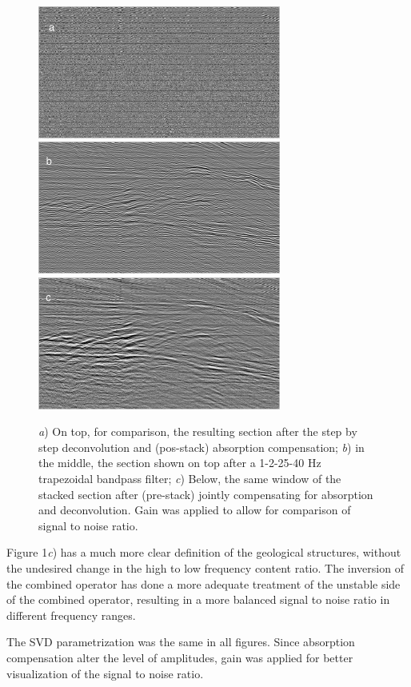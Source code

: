 \documentclass[twoside,letterpaper,twocolumn]{article}
\begin{document}
\begin{figure}[h!]
  \includegraphics[width=8cm]{images/Filtro_pos_empilhamento.jpg}
  \includegraphics[width=8cm]{images/Filtro1-2-25-40.jpg}
  \includegraphics[width=8cm]{images/Filtro_PA.jpg}
 \caption[Figure 1]{\textit{a}) On top, for comparison, the resulting section after the
step by step deconvolution and (pos-stack) absorption compensation; \textit{b}) in the middle, 
the section shown on top after a 1-2-25-40 Hz trapezoidal bandpass filter;  \textit{c}) Below, the
same window of the stacked section after (pre-stack) jointly compensating for absorption and 
deconvolution. Gain was applied to allow for comparison of signal to noise ratio.}
\end{figure}

Figure 1\textit{c}) has a much more clear definition of the geological structures, without 
the undesired change in the high to low frequency content ratio. The inversion of the combined operator
has done a more adequate treatment of the unstable side of the combined operator, resulting in a more balanced
signal to noise ratio in different frequency ranges. 

The SVD parametrization was the same in all figures. Since absorption compensation alter the 
level of amplitudes, gain was applied for better visualization of the signal to noise ratio.
\end{document}

